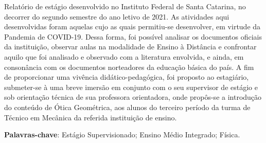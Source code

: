 \begin{resumo}
    Relatório de estágio desenvolvido no Instituto Federal de Santa Catarina, no decorrer do segundo semestre do ano letivo de 2021. As atividades aqui desenvolvidas foram aquelas cujo as quais permitiu-se desenvolver, em virtude da Pandemia de COVID-19. Dessa forma, foi possível analisar os documentos oficiais da instituição, observar aulas na modalidade de Ensino à Distância e confrontar aquilo que foi analisado e observado com a literatura envolvida, e ainda, em consonância com os documentos norteadores da educação básica do país. A fim de proporcionar uma vivência didático-pedagógica, foi proposto ao estagiário, submeter-se à uma breve imersão em conjunto com o seu supervisor de estágio e sob orientação técnica de sua professora orientadora, onde propôs-se a introdução do conteúdo de Ótica Geométrica, aos alunos  do terceiro período da turma de  Técnico em Mecânica da referida instituição de ensino.
    
    \vspace{\onelineskip}
    \noindent

    \textbf{Palavras-chave}: Estágio Supervisionado; Ensino Médio Integrado; Física.
\end{resumo}